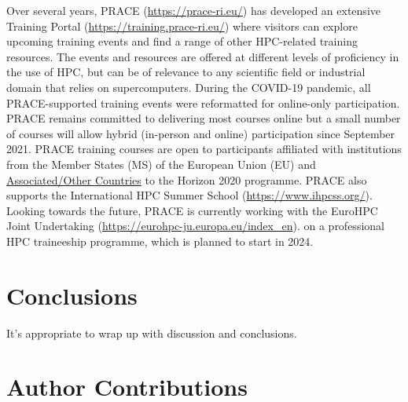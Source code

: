 \documentclass[9pt,review]{livecoms}
\begin{document}
Over several years, PRACE (\href{https://prace-ri.eu/}{https://prace-ri.eu/}) has developed an extensive Training Portal (\href{https://training.prace-ri.eu/}{https://training.prace-ri.eu/}) where visitors can explore upcoming training events and find a range of other HPC-related training resources.
The events and resources are offered at different levels of proficiency in the use of HPC, but can be of relevance to any scientific field or industrial domain that relies on supercomputers.
During the COVID-19 pandemic, all PRACE-supported training events were reformatted for online-only participation. 
PRACE remains committed to delivering most courses online but a small number of courses will allow hybrid (in-person and online) participation since September 2021.
PRACE training courses are open to participants affiliated with institutions from the Member States (MS) of the European Union (EU) and \href{https://ec.europa.eu/info/research-and-innovation/statistics/framework-programme-facts-and-figures/horizon-2020-country-profiles_en}{Associated/Other Countries} to the Horizon 2020 programme.
PRACE also supports the International HPC Summer School (\href{https://www.ihpcss.org/}{https://www.ihpcss.org/}).
Looking towards the future, PRACE is currently working with the EuroHPC Joint Undertaking 
(\href{https://eurohpc-ju.europa.eu/index_en}{https://eurohpc-ju.europa.eu/index\_en}).
on a professional HPC traineeship programme, which is planned to start in 2024.

\section{Conclusions}

It's appropriate to wrap up with discussion and conclusions.







\section*{Author Contributions}
%
\end{document}
